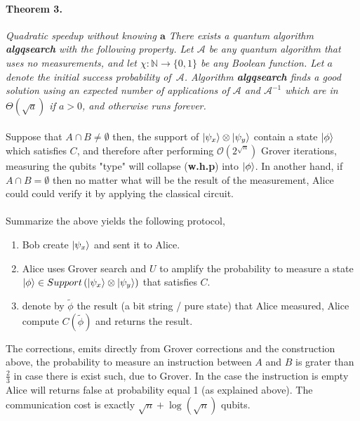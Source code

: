 \documentclass{article}
\newcommand{\onotation}[1]{\(\mathcal{O} \left( {#1}  \right) \)}
\newcommand{\ona}[1]{\onotation{#1}}
\begin{document}
\begin{multicols*}{2}
\paragraph{Theorem 3.} \textit{Quadratic speedup without knowing $\mathbf{a}$
There exists a quantum algorithm \textbf{algqsearch} with the following property.
Let $\mathcal A$ be any quantum algorithm that uses no measurements,
and let $\chi : \mathbb{N}  \rightarrow \{0,1\}$ be any Boolean function.
Let $a$ denote the initial success probability of~$\mathcal A$.
Algorithm \textbf{algqsearch} finds a good solution using an expected number
of applications of $\mathcal A$ and ${\mathcal A}^{-1}$ which are in
$\Theta(\sqrt a)$ if $a>0$, and otherwise runs forever.}

\paragraph{}
Suppose that \( A \cap B \neq \emptyset \) then, the support of \( \ket{\psi_x} \otimes \ket{\psi_y} \) contain a state \( \ket{\phi} \) which satisfies \(C\), and therefore  after performing \ona{ 2^{ \sqrt{n}}} Grover iterations, measuring the qubits "type" will collapse (\textbf{w.h.p}) into \( \ket{\phi} \). In another hand, if \( A \cap B = \emptyset \) then no matter what will be the result of the measurement, Alice could could verify it by applying the classical circuit. 
\paragraph{}Summarize the above yields the following protocol,
\begin{enumerate}
    \item Bob create \( \ket{\psi_x} \) and sent it to Alice.
    \item Alice uses Grover search and \(U\) to amplify the probability to measure a state \( \ket{\phi} \in Support \left(   \ket{\psi_x} \otimes \ket{\psi_y}  \right) \) that satisfies \(C\).
    \item denote by \( \tilde{\phi} \) the result (a bit string / pure state) that Alice measured, Alice compute \(C\left(\tilde{\phi}\right) \) and returns the result. 
\end{enumerate}
The corrections, emits directly from Grover corrections and the construction above, the probability to measure an instruction between \(A\) and \(B\) is grater than \( \frac{2}{3} \) in case there is exist such, due to Grover. In the case the instruction is empty Alice will returns false at probability equal 1 (as explained above). The communication cost is exactly  \( \sqrt{n} + \log(\sqrt{n}) \) qubits. 



\end{multicols*}
\end{document}
